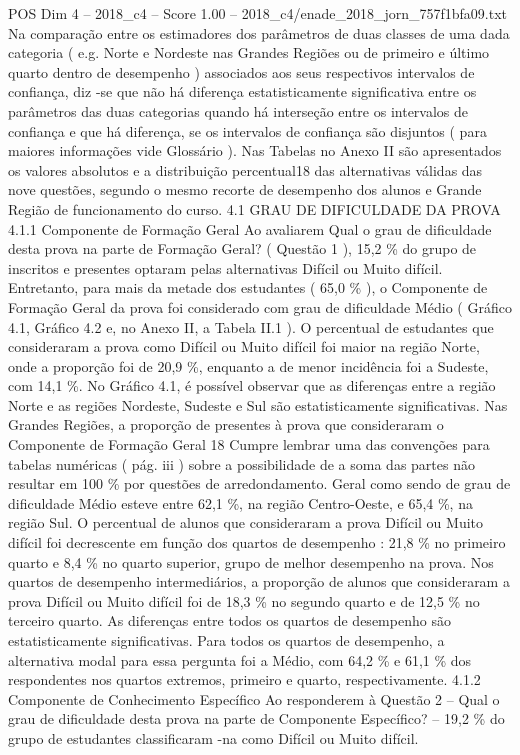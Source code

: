 \begin{textsample}{POS Dim 4 – 2018\_c4 – Score 1.00 – 2018\_c4/enade\_2018\_jorn\_757f1bfa09.txt}
Na comparação entre os estimadores dos parâmetros de duas classes de uma dada categoria ( e.g.
Norte e Nordeste nas Grandes Regiões ou de primeiro e último quarto dentro de desempenho ) associados aos seus respectivos intervalos de confiança, diz -se que não há diferença estatisticamente significativa entre os parâmetros das duas categorias quando há interseção entre os intervalos de confiança e que há diferença, se os intervalos de confiança são disjuntos ( para maiores informações vide Glossário ).
Nas Tabelas no Anexo II são apresentados os valores absolutos e a distribuição percentual18 das alternativas válidas das nove questões, segundo o mesmo recorte de desempenho dos alunos e Grande Região de funcionamento do curso. 4.1 GRAU DE DIFICULDADE DA PROVA 4.1.1 Componente de Formação Geral Ao avaliarem Qual o grau de dificuldade desta prova na parte de Formação Geral? ( Questão 1 ), 15,2 \% do grupo de inscritos e presentes optaram pelas alternativas Difícil ou Muito difícil.
Entretanto, para mais da metade dos estudantes ( 65,0 \% ), o Componente de Formação Geral da prova foi considerado com grau de dificuldade Médio ( Gráfico 4.1, Gráfico 4.2 e, no Anexo II, a Tabela II.1 ).
O percentual de estudantes que consideraram a prova como Difícil ou Muito difícil foi maior na região Norte, onde a proporção foi de 20,9 \%, enquanto a de menor incidência foi a Sudeste, com 14,1 \%.
No Gráfico 4.1, é possível observar que as diferenças entre a região Norte e as regiões Nordeste, Sudeste e Sul são estatisticamente significativas.
Nas Grandes Regiões, a proporção de presentes à prova que consideraram o Componente de Formação Geral 18 Cumpre lembrar uma das convenções para tabelas numéricas ( pág. iii ) sobre a possibilidade de a soma das partes não resultar em 100 \% por questões de arredondamento.
Geral como sendo de grau de dificuldade Médio esteve entre 62,1 \%, na região Centro-Oeste, e 65,4 \%, na região Sul.
O percentual de alunos que consideraram a prova Difícil ou Muito difícil foi decrescente em função dos quartos de desempenho : 21,8 \% no primeiro quarto e 8,4 \% no quarto superior, grupo de melhor desempenho na prova.
Nos quartos de desempenho intermediários, a proporção de alunos que consideraram a prova Difícil ou Muito difícil foi de 18,3 \% no segundo quarto e de 12,5 \% no terceiro quarto.
As diferenças entre todos os quartos de desempenho são estatisticamente significativas.
Para todos os quartos de desempenho, a alternativa modal para essa pergunta foi a Médio, com 64,2 \% e 61,1 \% dos respondentes nos quartos extremos, primeiro e quarto, respectivamente. 4.1.2 Componente de Conhecimento Específico Ao responderem à Questão 2 – Qual o grau de dificuldade desta prova na parte de Componente Específico? – 19,2 \% do grupo de estudantes classificaram -na como Difícil ou Muito difícil.

\end{textsample}
